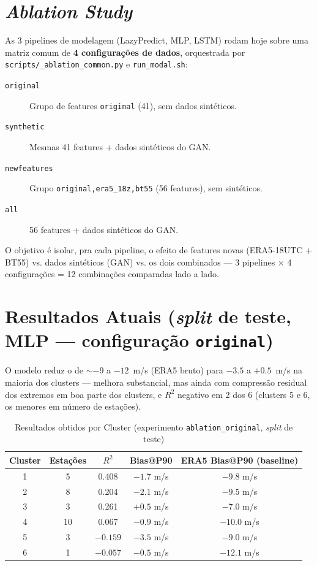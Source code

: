 \documentclass[11pt,a4paper]{article}
\begin{document}
\section{\textit{Ablation Study}}
\label{sec:ablation}
As 3 pipelines de modelagem (LazyPredict, MLP, LSTM) rodam hoje sobre uma matriz comum de \textbf{4 configurações de dados}, orquestrada por \texttt{scripts/\_ablation\_common.py} e \texttt{run\_modal.sh}:

\begin{description}
    \item[\texttt{original}] Grupo de features \texttt{original} (41), sem dados sintéticos.
    \item[\texttt{synthetic}] Mesmas 41 features + dados sintéticos do GAN.
    \item[\texttt{newfeatures}] Grupo \texttt{original,era5\_18z,bt55} (56 features), sem sintéticos.
    \item[\texttt{all}] 56 features + dados sintéticos do GAN.
\end{description}

\noindent O objetivo é isolar, pra cada pipeline, o efeito de features novas (ERA5-18UTC + BT55) vs. dados sintéticos (GAN) vs. os dois combinados --- 3 pipelines $\times$ 4 configurações = 12 combinações comparadas lado a lado.

\section{Resultados Atuais (\textit{split} de teste, MLP --- configuração \texttt{original})}
O modelo reduz o  de $\sim$$-9$ a $-12$~m/s (ERA5 bruto) para $-3.5$ a $+0.5$~m/s na maioria dos clusters --- melhora substancial, mas ainda com compressão residual dos extremos em boa parte dos clusters, e $R^2$ negativo em 2 dos 6 (clusters 5 e 6, os menores em número de estações).

\begin{table}[h]
\centering
\caption{Resultados obtidos por Cluster (experimento \texttt{ablation\_original}, \textit{split} de teste)}
\vspace{2mm}
\begin{tabular}{ccccc}
\toprule
\textbf{Cluster} & \textbf{Estações} & \textbf{$R^2$} & \textbf{Bias@P90} & \textbf{ERA5 Bias@P90 (baseline)} \\
\midrule
1 & 5  & 0.408  & $-1.7$ m/s & $-9.8$ m/s \\
2 & 8  & 0.204  & $-2.1$ m/s & $-9.5$ m/s \\
3 & 3  & 0.261  & $+0.5$ m/s & $-7.0$ m/s \\
4 & 10 & 0.067  & $-0.9$ m/s & $-10.0$ m/s \\
5 & 3  & $-0.159$ & $-3.5$ m/s & $-9.0$ m/s \\
6 & 1  & $-0.057$ & $-0.5$ m/s & $-12.1$ m/s \\
\bottomrule
\end{tabular}
\end{table}
\end{document}

